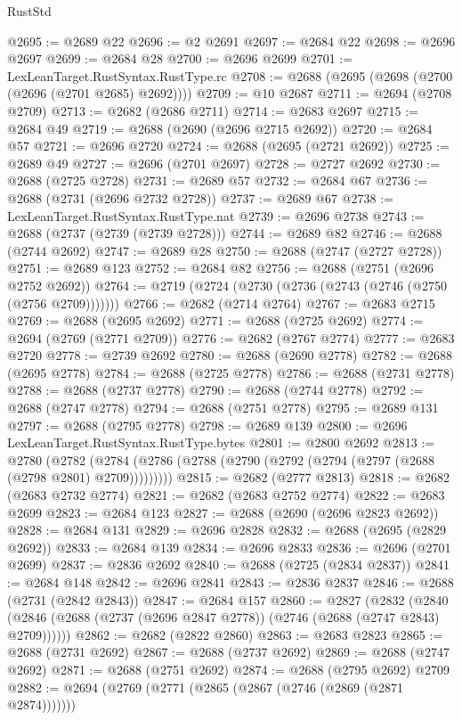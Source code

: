 \begin{lexlean}{RustStd}
\begin{coremodule}
@2695 := @2689 @22
@2696 := @2 @2691
@2697 := @2684 @22
@2698 := @2696 @2697
@2699 := @2684 @28
@2700 := @2696 @2699
@2701 := LexLeanTarget.RustSyntax.RustType.rc
@2708 := @2688 (@2695 (@2698 (@2700 (@2696 (@2701 @2685) @2692))))
@2709 := @10 @2687
@2711 := @2694 (@2708 @2709)
@2713 := @2682 (@2686 @2711)
@2714 := @2683 @2697
@2715 := @2684 @49
@2719 := @2688 (@2690 (@2696 @2715 @2692))
@2720 := @2684 @57
@2721 := @2696 @2720
@2724 := @2688 (@2695 (@2721 @2692))
@2725 := @2689 @49
@2727 := @2696 (@2701 @2697)
@2728 := @2727 @2692
@2730 := @2688 (@2725 @2728)
@2731 := @2689 @57
@2732 := @2684 @67
@2736 := @2688 (@2731 (@2696 @2732 @2728))
@2737 := @2689 @67
@2738 := LexLeanTarget.RustSyntax.RustType.nat
@2739 := @2696 @2738
@2743 := @2688 (@2737 (@2739 (@2739 @2728)))
@2744 := @2689 @82
@2746 := @2688 (@2744 @2692)
@2747 := @2689 @28
@2750 := @2688 (@2747 (@2727 @2728))
@2751 := @2689 @123
@2752 := @2684 @82
@2756 := @2688 (@2751 (@2696 @2752 @2692))
@2764 := @2719 (@2724 (@2730 (@2736 (@2743 (@2746 (@2750 (@2756 @2709)))))))
@2766 := @2682 (@2714 @2764)
@2767 := @2683 @2715
@2769 := @2688 (@2695 @2692)
@2771 := @2688 (@2725 @2692)
@2774 := @2694 (@2769 (@2771 @2709))
@2776 := @2682 (@2767 @2774)
@2777 := @2683 @2720
@2778 := @2739 @2692
@2780 := @2688 (@2690 @2778)
@2782 := @2688 (@2695 @2778)
@2784 := @2688 (@2725 @2778)
@2786 := @2688 (@2731 @2778)
@2788 := @2688 (@2737 @2778)
@2790 := @2688 (@2744 @2778)
@2792 := @2688 (@2747 @2778)
@2794 := @2688 (@2751 @2778)
@2795 := @2689 @131
@2797 := @2688 (@2795 @2778)
@2798 := @2689 @139
@2800 := @2696 LexLeanTarget.RustSyntax.RustType.bytes
@2801 := @2800 @2692
@2813 := @2780
    (@2782 (@2784 (@2786 (@2788 (@2790 (@2792 (@2794 (@2797 (@2688 (@2798 @2801) @2709)))))))))
@2815 := @2682 (@2777 @2813)
@2818 := @2682 (@2683 @2732 @2774)
@2821 := @2682 (@2683 @2752 @2774)
@2822 := @2683 @2699
@2823 := @2684 @123
@2827 := @2688 (@2690 (@2696 @2823 @2692))
@2828 := @2684 @131
@2829 := @2696 @2828
@2832 := @2688 (@2695 (@2829 @2692))
@2833 := @2684 @139
@2834 := @2696 @2833
@2836 := @2696 (@2701 @2699)
@2837 := @2836 @2692
@2840 := @2688 (@2725 (@2834 @2837))
@2841 := @2684 @148
@2842 := @2696 @2841
@2843 := @2836 @2837
@2846 := @2688 (@2731 (@2842 @2843))
@2847 := @2684 @157
@2860 := @2827
    (@2832 (@2840 (@2846 (@2688 (@2737 (@2696 @2847 @2778)) (@2746 (@2688 (@2747 @2843) @2709))))))
@2862 := @2682 (@2822 @2860)
@2863 := @2683 @2823
@2865 := @2688 (@2731 @2692)
@2867 := @2688 (@2737 @2692)
@2869 := @2688 (@2747 @2692)
@2871 := @2688 (@2751 @2692)
@2874 := @2688 (@2795 @2692) @2709
@2882 := @2694 (@2769 (@2771 (@2865 (@2867 (@2746 (@2869 (@2871 @2874)))))))

\end{coremodule}
\end{lexlean}
